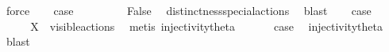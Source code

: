 \begin{isabellebody}
\ force\isanewline
\ \ \isamarkupfalse%
\ {\isacharquery}{\kern0pt}case\ \isacommand{{\isachardot}{\kern0pt}{\isachardot}{\kern0pt}}\isamarkupfalse%
\isanewline
{}\isamarkupfalse%
\isanewline
\ \ \isamarkupfalse%
\ {}\isanewline
\ \ \isamarkupfalse%
\ False\ \isamarkupfalse%
\ distinctness{\isacharunderscore}{\kern0pt}special{\isacharunderscore}{\kern0pt}actions\ \isamarkupfalse%
\ blast\isanewline
\ \ \isamarkupfalse%
\ {\isacharquery}{\kern0pt}case\ \isacommand{{\isachardot}{\kern0pt}{\isachardot}{\kern0pt}}\isamarkupfalse%
\isanewline
{}\isamarkupfalse%
\isanewline
\ \ \isamarkupfalse%
\ {}\isanewline
\ \ \isamarkupfalse%
\ {\isacartoucheopen}X\ {\isasymsubseteq}\ visible{\isacharunderscore}{\kern0pt}actions{\isacartoucheclose}\ \isamarkupfalse%
\ {\isacharparenleft}{\kern0pt}metis\ injectivity{\isacharunderscore}{\kern0pt}theta{\isacharparenleft}{\kern0pt}{}{\isacharparenright}{\kern0pt}{\isacharparenright}{\kern0pt}\isanewline
\ \ \isamarkupfalse%
\ {}\ \isamarkupfalse%
\ {\isacharquery}{\kern0pt}case\ \isamarkupfalse%
\ injectivity{\isacharunderscore}{\kern0pt}theta{\isacharparenleft}{\kern0pt}{}{\isacharparenright}{\kern0pt}\ \isamarkupfalse%
\ blast\isanewline
{}\isamarkupfalse%
%
\endisatagproof
{\isafoldproof}%
%
\isadelimproof
\isanewline
%
\endisadelimproof
\isanewline
{}\isamarkupfalse%
\ %
%
\isadelimtheory
%
\endisadelimtheory
%
\isatagtheory
%
\endisatagtheory
{\isafoldtheory}%
%
\isadelimtheory
%
\endisadelimtheory
%
\end{isabellebody}%
\endinput
